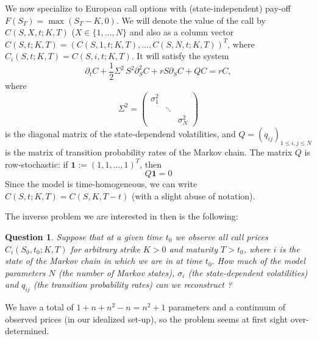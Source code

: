 \documentclass[a4paper, 11pt]{amsart}
\newtheorem{question}{Question}
\newtheorem{definition and theorem}[theorem]{Definition and   
Theorem}
\begin{document}
We now specialize to European call options with (state-independent) pay-off $F(S_T ) = \max (S_T - K , 0 ) . $ We will denote the value of the call by $C(S , X , t ; K, T ) $ ($X \in \{ 1, \ldots , N \} $ and also as a column vector $C (S , t ; K , T ) = \left( C (S, 1, t ; K, T ) , \ldots , C (S, N, t ; K , T ) \right) ^T $, where $C_i (S, t ; K, T ) = C(S , i , t ; K, T ) . $ It will satisfy the system
\begin{equation} \label{eq:PDE_call}
    \partial _t C + \frac{1 }{2 } \Sigma ^2 \, S^2 \partial _S ^2 C + r S \partial _S C + Q C = r C ,
\end{equation}
where %
\begin{equation}
    \Sigma ^2 = \begin{pmatrix} \sigma _1 ^2 & \      & \            \\
                \            & \ddots & \            \\
                \            & \      & \sigma _N ^2
    \end{pmatrix}
\end{equation}
is the diagonal matrix of the state-dependend volatilities, and $Q = (q_{ij } )_{1 \leq i, j \leq N } $ is the matrix of transition probability rates of the Markov chain. The matrix $Q $ is row-stochastic: if $\mathbf{1 } := (1, 1, \ldots , 1 )^T $, then
\begin{equation}
    Q \mathbf{1 } = 0
\end{equation}
Since the model is time-homogeneous, we can write $C (S , t ; K , T ) = C (S, K, T - t) $ (with a slight abuse of notation).
\medskip


The inverse problem we are interested in then is the following:

\begin{question} Suppose that at a given time $t_0 $ we observe all call prices $C_i (S_0 , t_0 ; K, T ) $ for arbitrary strike  $K > 0 $ and maturity $T > t_0 $, where $i $ is the state of the Markov chain in which we are in at time $t_0 . $ How much of the model parameters $N $ (the number of Markov states), $\sigma _i $ (the state-dependent volatilities) and $q_{ij } $ (the transition probability rates) can we reconstruct ?
\end{question}

We have a total of $1 + n + n^2 - n = n^2 + 1 $ parameters and a continuum of observed prices (in our idealized set-up), so the problem seems at first sight over-determined.
\medskip
\end{document}
